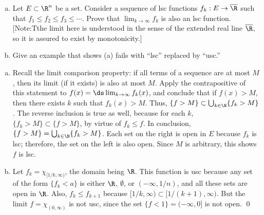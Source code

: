 \begin{hwsol} \hfill
\begin{enumerate}[(a)]
\item Let $E \subset \R^n$ be a set. Consider a sequence of lsc functions $f_k: E \to \overline{\R}$ such that $f_1\leq f_2 \leq f_3 \leq \cdots$. Prove that $\lim_{k \to \infty} f_k$ is also an lsc function. [Note:Tthe limit here is understood in the sense of the extended real line $\overline{\R}$, so it is assured to exist by monotonicity.]
\item Give an example that shows (a) fails with ``lsc'' replaced by ``usc.'' \\
\end{enumerate}

\pf \hfill
\begin{enumerate}[(a)]
\item Recall the limit comparison property: if all terms of a sequence are at most $M$, then its limit (if it exists) is also at most $M$. Apply the contrapositive of this statement to $f(x)= \ds\lim_{k \to \infty} f_k(x)$, and conclude that if $f(x) > M$, then there exists $k$ such that $f_k(x) > M$. Thus, $\{ f>M \} \subset \bigcup_{k \in \N} \{ f_k > M \}$. The reverse inclusion is true as well, because for each $k$, $\{ f_k > M \} \subset \{ f > M \}$, by virtue of $f_k \leq f$. In conclusion, $\{ f > M \}= \bigcup_{k \in \N} \{ f_k > M \}$. Each set on the right is open in $E$ because $f_k$ is lsc; therefore, the set on the left is also open. Since $M$ is arbitrary, this shows $f$ is lsc.  

\item Let $f_k= \chi_{[1/k, \infty)}$, the domain being $\R$. This function is usc because any set of the form $\{ f_k < a \}$ is either $\R$, $\emptyset$, or $(-\infty,1/n)$, and all these sets are open in $\R$. Also, $f_k \leq f_{k+1}$ because $[1/k, \infty) \subset [1/(k+1),\infty)$. But the limit $f= \chi_{(0, \infty)}$ is not usc, since the set $\{ f < 1 \} = (-\infty, 0]$ is not open. \qed \\
\end{enumerate}
\end{hwsol}

